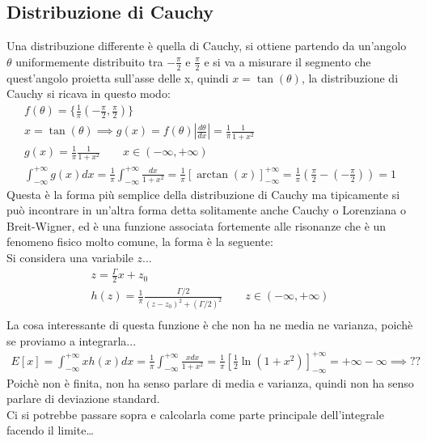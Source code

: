 \documentclass[a4paper, oneside]{article}
\begin{document}
\subsection{Distribuzione di Cauchy}
Una distribuzione differente è quella di Cauchy, si ottiene partendo da un'angolo $\theta$ uniformemente distribuito tra $-\frac{\pi}{2}$ e $\frac{\pi}{2}$ e si va a misurare il segmento che quest'angolo proietta sull'asse delle x, quindi $x = \tan(\theta)$, la distribuzione di Cauchy si ricava in questo modo:
\begin{gather*}
    f(\theta) = \{ \frac{1}{\pi} (-\frac{\pi}{2} , \frac{\pi}{2}) \}\\
    x = \tan(\theta) \implies g(x) = f(\theta) \left\lvert \frac{d\theta}{dx} \right\rvert = \frac{1}{\pi} \frac{1}{1 + x^2}\\
    g(x) = \frac{1}{\pi} \frac{1}{1 + x^2} \qquad x \in (-\infty, +\infty)\\
    \int_{-\infty}^{+\infty} g(x) dx = \frac{1}{\pi} \int_{-\infty}^{+\infty} \frac{dx}{1 + x^2} = \frac{1}{\pi} \left[ \arctan(x) \right]_{-\infty}^{+\infty} = \frac{1}{\pi} \left( \frac{\pi}{2} - (-\frac{\pi}{2}) \right) = 1
\end{gather*}
Questa è la forma più semplice della distribuzione di Cauchy ma tipicamente si può incontrare in un'altra forma detta solitamente anche Cauchy o Lorenziana o Breit-Wigner, ed è una funzione associata fortemente alle risonanze che è un fenomeno fisico molto comune, la forma è la seguente:\\
Si considera una variabile $z$...
\begin{gather*}
    z = \frac{\Gamma}{2} x + z_0\\
    h(z) = \frac{1}{\pi} \frac{\Gamma/2}{(z - z_0)^2 + (\Gamma/2)^2} \qquad z \in (-\infty, +\infty)\\
\end{gather*}
La cosa interessante di questa funzione è che non ha ne media ne varianza, poichè se proviamo a integrarla...
\begin{gather*}
    E[x] = \int_{-\infty}^{+\infty} x h(x) dx = \frac{1}{\pi} \int_{-\infty}^{+\infty} \frac{x dx}{1 + x^2} = \frac{1}{\pi} \left[ \frac{1}{2} \ln(1 + x^2) \right]_{-\infty}^{+\infty} = +\infty - \infty \implies \text{??}
\end{gather*}
Poichè non è finita, non ha senso parlare di media e varianza, quindi non ha senso parlare di deviazione standard.\\
Ci si potrebbe passare sopra e calcolarla come parte principale dell'integrale facendo il limite\dots
\end{document}
